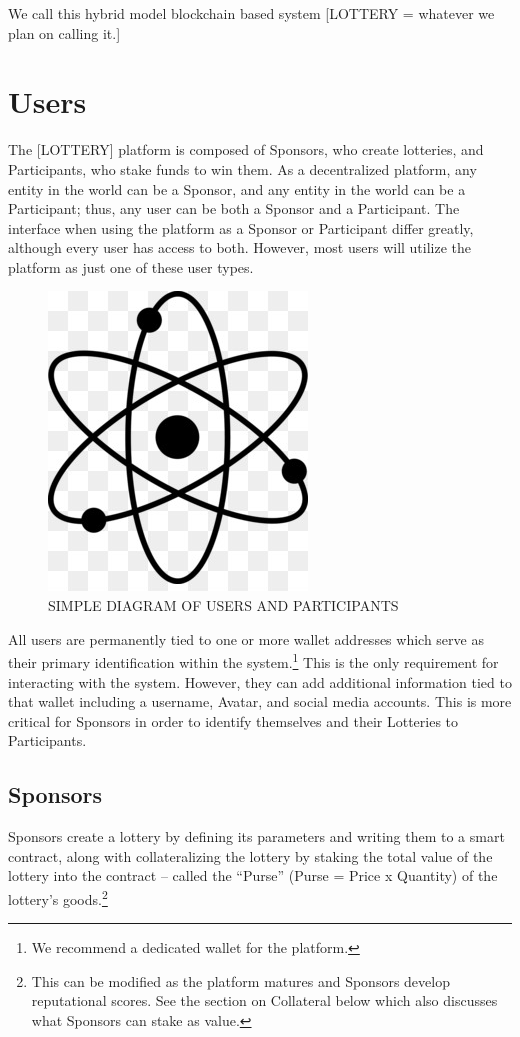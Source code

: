 \documentclass[runningheads]{llncs}
\begin{document}
We call this hybrid model blockchain based system [LOTTERY = whatever we plan on calling it.]



\section{Users}\label{section-Users}

The [LOTTERY] platform is composed of Sponsors, who create lotteries, and Participants, who stake funds to win them.  As a decentralized platform, any entity in the world can be a Sponsor, and any entity in the world can be a Participant; thus, any user can be both a Sponsor and a Participant.  The interface when using the platform as a Sponsor or Participant differ greatly, although every user has access to both.  However, most users will utilize the platform as just one of these user types.

\begin{figure}[H]
\centering
\includegraphics[scale=0.5]{Figures_and_Tables/atom.png}
\caption{SIMPLE DIAGRAM OF USERS AND PARTICIPANTS}
\end{figure}

All users are permanently tied to one or more wallet addresses which serve as their primary identification within the system.\footnote{We recommend a dedicated wallet for the platform.}  This is the only requirement for interacting with the system. However, they can add additional information tied to that wallet including a username, Avatar, and social media accounts.  This is more critical for Sponsors in order to identify themselves and their Lotteries to Participants.

\subsection{Sponsors}\label{subsection-Sponsors}
Sponsors create a lottery by defining its parameters and writing them to a smart contract, along with collateralizing the lottery by staking the total value of the lottery into the contract – called the “Purse” (Purse = Price x Quantity) of the lottery’s goods.\footnote{This can be modified as the platform matures and Sponsors develop reputational scores.  See the section on Collateral below which also discusses what Sponsors can stake as value.}
\end{document}

